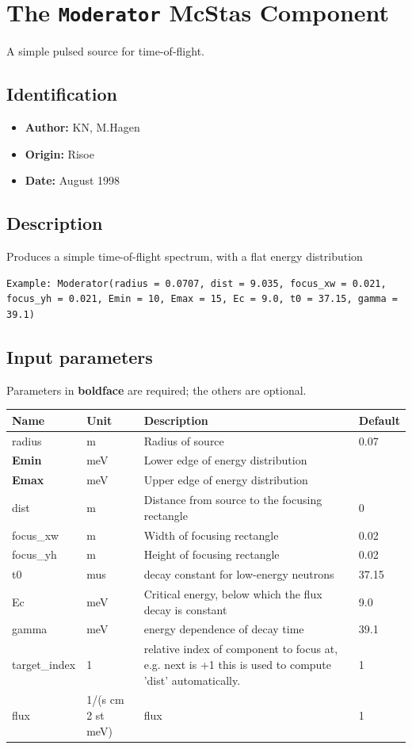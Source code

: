 \section{The \texttt{Moderator} McStas Component}
A simple pulsed source for time-of-flight.

\subsection*{Identification}
\begin{itemize}
  \item \textbf{Author:} KN, M.Hagen
  \item \textbf{Origin:} Risoe
  \item \textbf{Date:} August 1998
\end{itemize}

\subsection*{Description}
Produces a simple time-of-flight spectrum, with a flat energy distribution

\begin{verbatim}
Example: Moderator(radius = 0.0707, dist = 9.035, focus_xw = 0.021, focus_yh = 0.021, Emin = 10, Emax = 15, Ec = 9.0, t0 = 37.15, gamma = 39.1)
\end{verbatim}

\subsection*{Input parameters}
Parameters in \textbf{boldface} are required; the others are optional.

\begin{longtable}{p{}p{}p{}p{}}
\toprule
\textbf{Name} & \textbf{Unit} & \textbf{Description} & \textbf{Default} \\
\midrule
\endhead
radius & m & Radius of source & 0.07 \\
\textbf{Emin} & meV & Lower edge of energy distribution &  \\
\textbf{Emax} & meV & Upper edge of energy distribution &  \\
dist & m & Distance from source to the focusing rectangle & 0 \\
focus\_xw & m & Width of focusing rectangle & 0.02 \\
focus\_yh & m & Height of focusing rectangle & 0.02 \\
t0 & mus & decay constant for low-energy neutrons & 37.15 \\
Ec & meV & Critical energy, below which the flux decay is constant & 9.0 \\
gamma & meV & energy dependence of decay time & 39.1 \\
target\_index & 1 & relative index of component to focus at, e.g. next is +1 this is used to compute 'dist' automatically. & 1 \\
flux & 1/(s cm 2 st meV) & flux & 1 \\
\bottomrule
\end{longtable}


